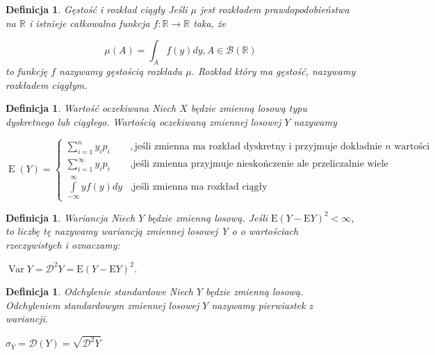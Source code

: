 \documentclass[12pt,a4paper]{report}
\newtheorem{definition}[theorem]{Definicja}
\newcommand{\Ex}{\operatorname{E}}
\newcommand{\Variance}{\operatorname{Var}}
\begin{document}
\begin{definition}{Gęstość i rozkład ciągły \cite[Rozdział 5.1]{jakubowski2004}}
Jeśli $\mu$ jest rozkładem prawdopodobieństwa na $\mathbb{R}$ i istnieje całkowalna funkcja $f: \mathbb{R} \rightarrow \mathbb{R}$ taka, że 

$$\mu(A)=\int_A f(y)dy,   A\in \mathcal{B}(\mathbb{R})  $$  %
to funkcję $f$ nazywamy gęstością rozkładu $\mu$. Rozkład który ma gęstość, nazywamy rozkładem ciągłym. 
\end{definition}



\begin{definition}{Wartość oczekiwana \cite[Rozdział 2.6]{krysicki1999}}
Niech $X$ będzie zmienną losową typu dyskretnego lub ciągłego. Wartością oczekiwaną zmiennej losowej $Y$ nazywamy 

$$
\Ex (Y)=\left\{ \begin{array}{ll}
\sum\limits_{i=1}^{n} {y_ip_i} &, \textrm{jeśli zmienna ma rozkład dyskretny i przyjmuje dokładnie $n$ wartości }\\ 
\sum\limits_{i=1}^{\infty} {y_ip_i} &, \textrm{jeśli zmienna przyjmuje nieskończenie ale przeliczalnie wiele wartości}\\
\int\limits_{-\infty}^{\infty} {yf(y)dy} &, \textrm{jeśli zmienna ma rozkład ciągły}
\end{array} \right.
$$

\end{definition}


\begin{definition}{Wariancja \cite[Rozdział 5.6]{jakubowski2004}}
Niech $Y$ będzie zmienną losową. Jeśli $\mathrm{E}(Y-\mathrm{E}Y)^2 < \infty$, to liczbę tę nazywamy wariancją zmiennej losowej Y o o wartościach rzeczywistych i oznaczamy:

$\Variance Y= \mathcal{D}^2Y=\mathrm{E}(Y-\mathrm{E}Y)^2$.

\end{definition}


\begin{definition}{Odchylenie standardowe \cite[Rozdział 5.6]{jakubowski2004}}
Niech $Y$ będzie zmienną losową. Odchyleniem standardowym zmiennej losowej $Y$ nazywamy pierwiastek z wariancji. 

$\sigma_Y=\mathcal{D}(Y)=\sqrt{\mathcal{D}^2Y}$

\end{definition}
\end{document}
